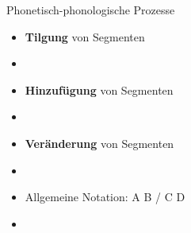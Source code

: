 \begin{frame}{Phonetisch-phonologische Prozesse}

\begin{itemize}
	\item \textbf{Tilgung} von Segmenten
	\item[]
	\item \textbf{Hinzufügung} von Segmenten
	\item[]
	\item \textbf{Veränderung} von Segmenten
	\item[]
	\item Allgemeine Notation: A \ras B / C \underline{\quad} D
	\item[]  
\end{itemize}

\end{frame}



